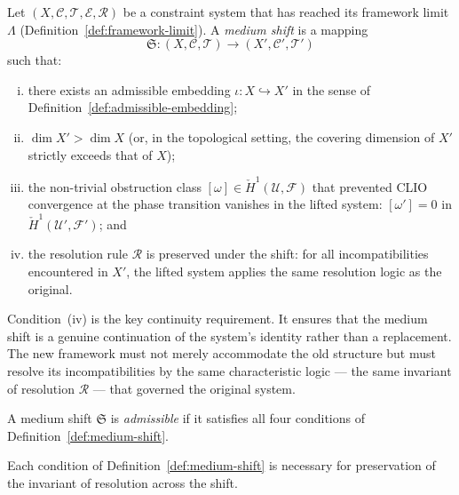 \documentclass[11pt,openany]{book}
\begin{document}
\begin{definition}
\label{def:medium-shift}
Let $(X, \mathcal{C}, \mathcal{T}, \mathcal{E},
\mathcal{R})$ be a constraint system that has reached its
framework limit $\Lambda$
(Definition~\ref{def:framework-limit}).  A \emph{medium
shift} is a mapping
\[
  \mathfrak{S} : (X, \mathcal{C}, \mathcal{T})
  \longrightarrow (X', \mathcal{C}', \mathcal{T}')
\]
such that:
\begin{enumerate}[(i)]
  \item there exists an admissible embedding
    $\iota : X \hookrightarrow X'$ in the sense of
    Definition~\ref{def:admissible-embedding};
  \item $\dim X' > \dim X$ (or, in the topological
    setting, the covering dimension of $X'$ strictly
    exceeds that of $X$);
  \item the non-trivial obstruction class
    $[\omega] \in \check{H}^1(\mathcal{U}, \mathcal{F})$
    that prevented CLIO convergence at the phase transition
    vanishes in the lifted system:
    $[\omega'] = 0$ in
    $\check{H}^1(\mathcal{U}', \mathcal{F}')$; and
  \item the resolution rule $\mathcal{R}$ is preserved
    under the shift: for all incompatibilities encountered
    in $X'$, the lifted system applies the same
    resolution logic as the original.
\end{enumerate}
\end{definition}

Condition~(iv) is the key continuity requirement.  It
ensures that the medium shift is a genuine continuation
of the system's identity rather than a replacement.  The
new framework must not merely accommodate the old structure
but must resolve its incompatibilities by the same
characteristic logic — the same invariant of resolution
$\mathcal{R}$ — that governed the original system.

\begin{definition}
\label{def:admissible-shift}
A medium shift $\mathfrak{S}$ is \emph{admissible} if it
satisfies all four conditions of
Definition~\ref{def:medium-shift}.
\end{definition}

\begin{proposition}
\label{prop:necessity}
Each condition of Definition~\ref{def:medium-shift} is
necessary for preservation of the invariant of resolution
across the shift.
\end{proposition}
\end{document}
